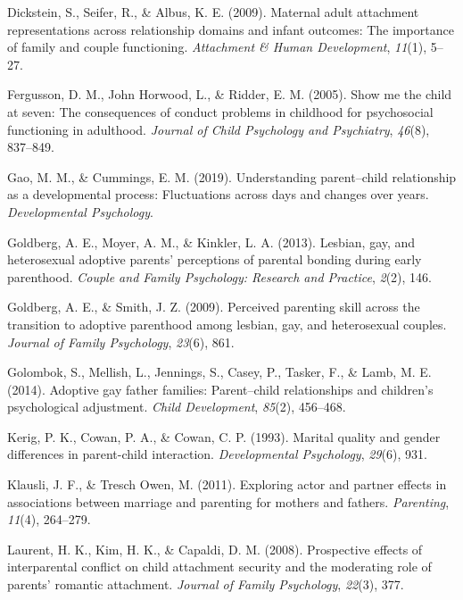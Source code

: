 \documentclass[man]{apa6}
\begin{document}
\leavevmode\hypertarget{ref-dickstein2009maternal}{}%
Dickstein, S., Seifer, R., \& Albus, K. E. (2009). Maternal adult attachment representations across relationship domains and infant outcomes: The importance of family and couple functioning. \emph{Attachment \& Human Development}, \emph{11}(1), 5--27.

\leavevmode\hypertarget{ref-fergusson2005show}{}%
Fergusson, D. M., John Horwood, L., \& Ridder, E. M. (2005). Show me the child at seven: The consequences of conduct problems in childhood for psychosocial functioning in adulthood. \emph{Journal of Child Psychology and Psychiatry}, \emph{46}(8), 837--849.

\leavevmode\hypertarget{ref-gao2019understanding}{}%
Gao, M. M., \& Cummings, E. M. (2019). Understanding parent--child relationship as a developmental process: Fluctuations across days and changes over years. \emph{Developmental Psychology}.

\leavevmode\hypertarget{ref-goldberg2013lesbian}{}%
Goldberg, A. E., Moyer, A. M., \& Kinkler, L. A. (2013). Lesbian, gay, and heterosexual adoptive parents' perceptions of parental bonding during early parenthood. \emph{Couple and Family Psychology: Research and Practice}, \emph{2}(2), 146.

\leavevmode\hypertarget{ref-goldberg2009perceived}{}%
Goldberg, A. E., \& Smith, J. Z. (2009). Perceived parenting skill across the transition to adoptive parenthood among lesbian, gay, and heterosexual couples. \emph{Journal of Family Psychology}, \emph{23}(6), 861.

\leavevmode\hypertarget{ref-golombok2014adoptive}{}%
Golombok, S., Mellish, L., Jennings, S., Casey, P., Tasker, F., \& Lamb, M. E. (2014). Adoptive gay father families: Parent--child relationships and children's psychological adjustment. \emph{Child Development}, \emph{85}(2), 456--468.

\leavevmode\hypertarget{ref-kerig1993marital}{}%
Kerig, P. K., Cowan, P. A., \& Cowan, C. P. (1993). Marital quality and gender differences in parent-child interaction. \emph{Developmental Psychology}, \emph{29}(6), 931.

\leavevmode\hypertarget{ref-klausli2011exploring}{}%
Klausli, J. F., \& Tresch Owen, M. (2011). Exploring actor and partner effects in associations between marriage and parenting for mothers and fathers. \emph{Parenting}, \emph{11}(4), 264--279.

\leavevmode\hypertarget{ref-laurent2008prospective}{}%
Laurent, H. K., Kim, H. K., \& Capaldi, D. M. (2008). Prospective effects of interparental conflict on child attachment security and the moderating role of parents' romantic attachment. \emph{Journal of Family Psychology}, \emph{22}(3), 377.
\end{document}
